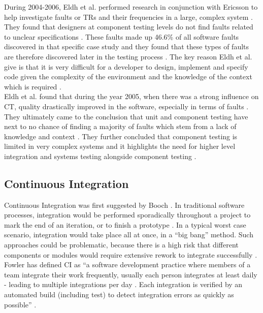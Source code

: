 \documentclass[fina_report_innit.tex]{subfiles}
\begin{document}
During 2004-2006, Eldh et al. performed research in conjunction with Ericsson to help investigate faults or TRs and their frequencies in a large, complex system \cite{eldh2007component}. They found that designers at component testing levels do not find faults related to unclear specifications \cite{eldh2007component}. These faults made up 46.6\% of all software faults discovered in that specific case study and they found that these types of faults are therefore discovered later in the testing process \cite{eldh2007component}. The key reason Eldh et al. give is that it is very difficult for a developer to design, implement and specify code given the complexity of the environment and the knowledge of the context which is required \cite{eldh2007component}. 
\\

Eldh et al. found that during the year 2005, when there was a strong influence on CT, quality drastically improved in the software, especially in terms of faults \cite{eldh2007component}. They ultimately came to the conclusion that unit and component testing have next to no chance of finding a majority of faults which stem from a lack of knowledge and context \cite{eldh2007component}. They further concluded that component testing is limited in very complex systems and it highlights the need for higher level integration and systems testing alongside component testing \cite{eldh2007component}.

\subsection{Continuous Integration}
Continuous Integration was first suggested by Booch \cite{booch2006object}. In traditional software processes, integration would be performed sporadically throughout a project to mark the end of an iteration, or to finish a prototype \cite{booch2006object}. In a typical worst case scenario, integration would take place all at once, in a “big bang” method. Such approaches could be problematic, because there is a high risk that different components or modules would require extensive rework to integrate successfully \cite{booch2006object}.
\\

Fowler has defined CI as “a software development practice where members of a team  integrate  their  work  frequently,  usually  each person  integrates  at  least  daily  -  leading  to  multiple integrations per day \cite{fowler2006continuous}. Each integration is verified by an automated build (including test) to detect integration errors as quickly as possible” \cite{fowler2006continuous}.
\\
\end{document}

